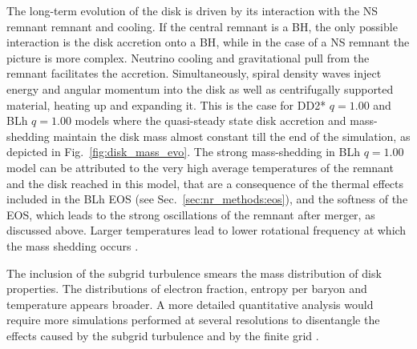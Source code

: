 The long-term evolution of the disk is driven by its interaction with the \ac{NS} remnant 
remnant and cooling. If the central remnant is a \ac{BH}, the only possible 
interaction is the disk accretion onto a \ac{BH}, while in the case of a \ac{NS} remnant 
the picture is more complex.
%
Neutrino cooling and gravitational pull from the remnant facilitates the 
accretion. Simultaneously, spiral density waves inject %
energy and angular momentum into the disk as well as centrifugally supported 
material, heating up and expanding it.  %
This is the case for DD2* $q=1.00$ and BLh $q=1.00$ models where the quasi-steady 
state disk accretion and mass-shedding maintain the disk mass almost constant 
till the end of the simulation, as depicted in Fig.~\ref{fig:disk_mass_evo}.
%
%
The strong mass-shedding in BLh $q=1.00$ model can be attributed to the very 
high average temperatures of the remnant and the disk reached in this model, 
that are a consequence of the thermal 
effects included in the BLh \ac{EOS} (see Sec.~\ref{sec:nr_methods:eos}), and the 
softness of the \ac{EOS}, which leads to the strong oscillations of the remnant 
after merger, as discussed above. Larger temperatures lead to lower rotational 
frequency at which the mass shedding occurs \citep{Kaplan:2013wra}. 

The inclusion of the subgrid turbulence smears the mass distribution of disk 
properties. The distributions of electron fraction, entropy per baryon and 
temperature appears broader. A more detailed quantitative analysis would require more 
simulations performed at several resolutions to disentangle the effects 
caused by the subgrid turbulence and by the finite grid \citep{Bernuzzi:2020txg,Radice:2020ids}.



